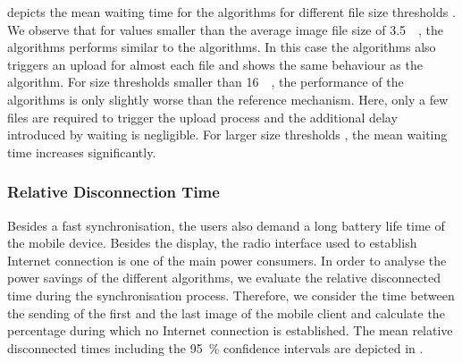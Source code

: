  depicts the mean waiting time \sojournTime for the \algosize algorithms for different file size thresholds \thresholdSize.
We observe that for values smaller than the average image file size of \SI{3.5}{\mega\byte}, the \algosize algorithms performs similar to the \algoimmediate algorithms.
In this case the \algosize algorithms also triggers an upload for almost each file and shows the same behaviour as the \algoimmediate algorithm.
For size thresholds \thresholdSize smaller than \SI{16}{\mega\byte}, the performance of the \algosize algorithms is only slightly worse than the reference mechanism.
Here, only a few files are required to trigger the upload process and the additional delay introduced by waiting is negligible.
For larger size thresholds \thresholdSize, the mean waiting time \sojournTime increases significantly.

\subsubsection*{Relative Disconnection Time}\label{sec:application:cloud_file_synchronisation:numerical_evaluation:relative_disconnection_time}

Besides a fast synchronisation, the users also demand a long battery life time of the mobile device.
Besides the display, the radio interface used to establish Internet connection is one of the main power consumers.
In order to analyse the power savings of the different algorithms, we evaluate the relative disconnected time  \relativeDisconnectedTime during the synchronisation process.
Therefore, we consider the time between the sending of the first and the last image of the mobile client and calculate the percentage during which no Internet connection is established.
The mean relative disconnected times including the \SI{95}{\percent} confidence intervals are depicted in .


